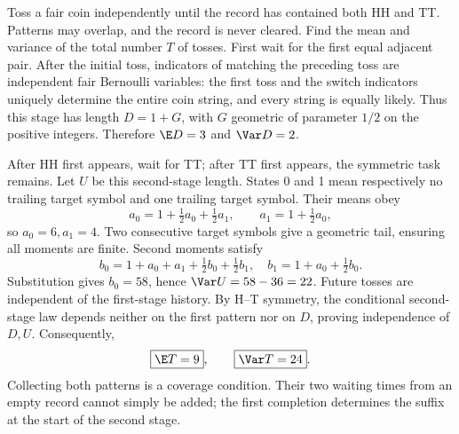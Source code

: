 Toss a fair coin independently until the record has contained both HH and TT. Patterns may overlap, and the record is never cleared. Find the mean and variance of the total number $T$ of tosses.
\solution First wait for the first equal adjacent pair. After the initial toss, indicators of matching the preceding toss are independent fair Bernoulli variables: the first toss and the switch indicators uniquely determine the entire coin string, and every string is equally likely. Thus this stage has length $D=1+G$, with $G$ geometric of parameter $1/2$ on the positive integers. Therefore $\E D=3$ and $\Var D=2$.

After HH first appears, wait for TT; after TT first appears, the symmetric task remains. Let $U$ be this second-stage length. States 0 and 1 mean respectively no trailing target symbol and one trailing target symbol. Their means obey
\[
 a_0=1+\tfrac12a_0+\tfrac12a_1,\qquad
 a_1=1+\tfrac12a_0,
\]
so $a_0=6,a_1=4$. Two consecutive target symbols give a geometric tail, ensuring all moments are finite. Second moments satisfy
\[
 b_0=1+a_0+a_1+\tfrac12b_0+\tfrac12b_1,
 \quad b_1=1+a_0+\tfrac12b_0.
\]
Substitution gives $b_0=58$, hence $\Var U=58-36=22$. Future tosses are independent of the first-stage history. By H--T symmetry, the conditional second-stage law depends neither on the first pattern nor on $D$, proving independence of $D,U$. Consequently,
\[
 \boxed{\E T=9},\qquad \boxed{\Var T=24}.
\]
\insight Collecting both patterns is a coverage condition. Their two waiting times from an empty record cannot simply be added; the first completion determines the suffix at the start of the second stage.
